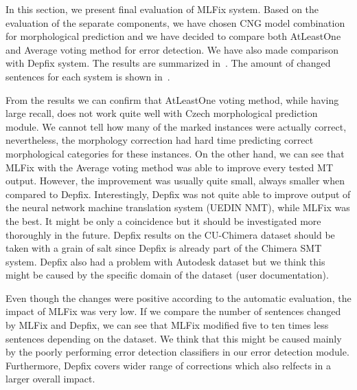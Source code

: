 In this section, we present final evaluation of MLFix system. Based on the evaluation of the
separate components, we have chosen CNG model combination for morphological prediction and we
have decided to compare both AtLeastOne and Average voting method for error detection. We
have also made comparison with Depfix system. The results are summarized in~.
The amount of changed sentences for each system is shown in~.

From the results we can confirm that AtLeastOne voting method, while having large recall, does not work
quite well with Czech morphological prediction module. We cannot tell how many of the marked instances were actually
correct, nevertheless, the morphology correction had hard time predicting correct morphological categories
for these instances. On the other hand, we can see that MLFix with the Average voting method
was able to improve every tested MT output. However, the improvement was
usually quite small, always smaller when compared to Depfix. Interestingly,
Depfix was not quite able to improve output of the neural network machine translation system (UEDIN NMT),
while MLFix was the best. It might be only a coincidence but it should be investigated more thoroughly
in the future. Depfix results on the CU-Chimera dataset should be taken with a grain of salt since
Depfix is already part of the Chimera SMT system. Depfix also had a problem with Autodesk dataset
but we think this might be caused by the specific domain of the dataset (user documentation).

Even though the changes were positive according to the automatic evaluation, the impact of MLFix was
very low. If we compare the number of sentences changed by MLFix and Depfix, we can see that MLFix
modified five to ten times less sentences depending on the dataset. We think that this might be
caused mainly by the poorly performing error detection classifiers in our error detection module.
Furthermore, Depfix covers wider range of corrections which also relfects in a larger overall impact.

